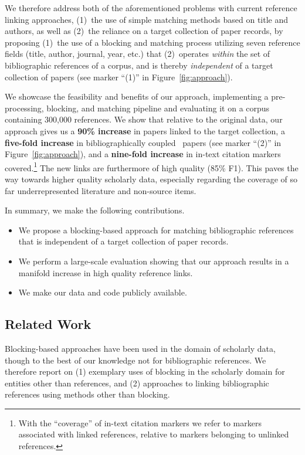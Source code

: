 We therefore address both of the aforementioned problems with current reference linking approaches, (1)~the use of simple matching methods based on title and authors, as well as (2)~the reliance on a target collection of paper records, by proposing (1)~the use of a blocking and matching process utilizing seven reference fields (title, author, journal, year, etc.) that (2)~operates \emph{within} the set of bibliographic references of a corpus, and is thereby \emph{independent} of a target collection of papers (see marker ``(1)'' in Figure~\ref{fig:approach}).

We showcase the feasibility and benefits of our approach, implementing a pre-processing, blocking, and matching pipeline and evaluating it on a corpus containing 300,000 references.
We show that relative to the original data, our approach gives us a \textbf{90\% increase} in papers linked to the target collection, a \textbf{five-fold increase} in bibliographically coupled~\cite{Boyack2010} papers (see marker ``(2)'' in Figure~\ref{fig:approach}), and a \textbf{nine-fold increase} in in-text citation markers covered.\footnote{With the ``coverage'' of in-text citation markers we refer to markers associated with linked references, relative to markers belonging to unlinked references.} The new links are furthermore of high quality (85\% F1). This paves the way towards higher quality scholarly data, especially regarding the coverage of so far underrepresented literature and non-source items.

In summary, we make the following contributions.

\begin{itemize}
    \item We propose a blocking-based approach for matching bibliographic references that is independent of a target collection of paper records.
    \item We perform a large-scale evaluation showing that our approach results in a manifold increase in high quality reference links.
    \item We make our data and code publicly available.
\end{itemize}

\subsection{Related Work}
Blocking-based approaches have been used in the domain of scholarly data, though to the best of our knowledge not for bibliographic references. We therefore report on (1) exemplary uses of blocking in the scholarly domain for entities other than references, and (2) approaches to linking bibliographic references using methods other than blocking.

